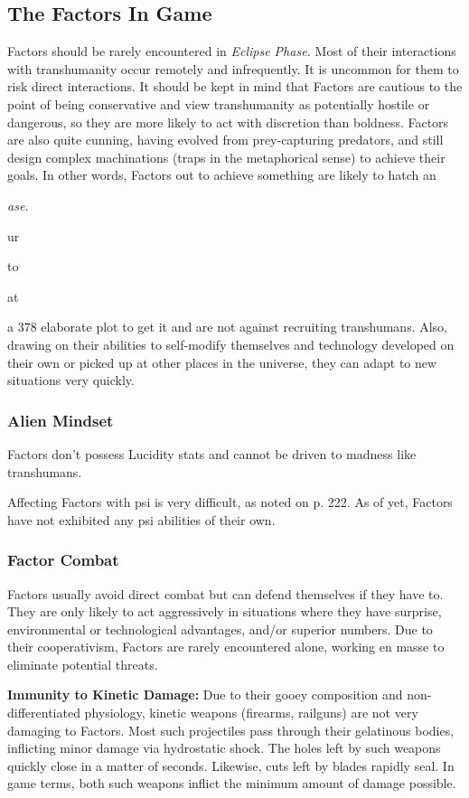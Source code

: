 \subsection{The Factors In Game }

Factors should be rarely encountered in \textit{Eclipse Phase.}
Most of their interactions with transhumanity occur 
remotely and infrequently. It is uncommon for them to 
risk direct interactions. It should be kept in mind that 
Factors are cautious to the point of being conservative
and view transhumanity as potentially hostile or
dangerous, so they are more likely to act with discretion
than boldness. Factors are also quite cunning,
having evolved from prey-capturing predators, and 
still design complex machinations (traps in the metaphorical
sense) to achieve their goals. In other words,
Factors out to achieve something are likely to hatch an 

\textit{ase.}

ur 

to 

at

a
378
elaborate plot to get it and are not against recruiting 
transhumans. Also, drawing on their abilities to self-modify
themselves and technology developed on their
own or picked up at other places in the universe, they 
can adapt to new situations very quickly. 

\subsubsection{Alien Mindset}

Factors don't possess Lucidity stats and cannot be 
driven to madness like transhumans.

Affecting Factors with psi is very difficult, as noted 
on p. 222. As of yet, Factors have not exhibited any 
psi abilities of their own.

\subsubsection{Factor Combat }

Factors usually avoid direct combat but can defend 
themselves if they have to. They are only likely to act 
aggressively in situations where they have surprise, 
environmental or technological advantages, and/or 
superior numbers. Due to their cooperativism, Factors
are rarely encountered alone, working en masse
to eliminate potential threats.

\textbf{Immunity to Kinetic Damage: }Due to their gooey 
composition and non-differentiated physiology, kinetic
weapons (firearms, railguns) are not very damaging
to Factors. Most such projectiles pass through their 
gelatinous bodies, inflicting minor damage via hydrostatic
shock. The holes left by such weapons quickly
close in a matter of seconds. Likewise, cuts left by 
blades rapidly seal. In game terms, both such weapons 
inflict the minimum amount of damage possible. 

